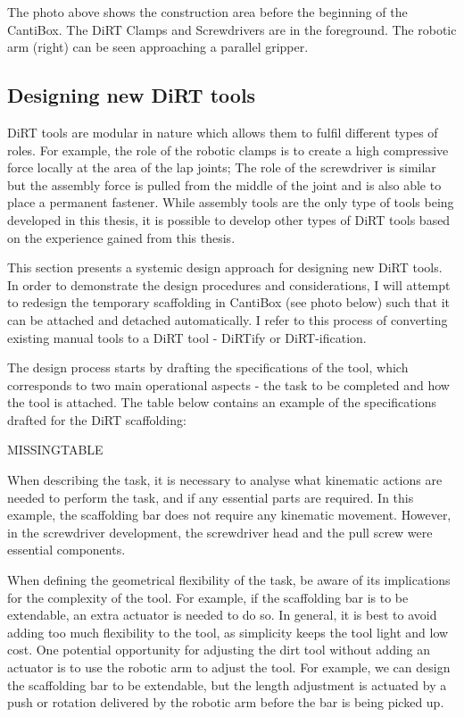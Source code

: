 


The photo above shows the construction area before the beginning of the CantiBox. The DiRT Clamps and Screwdrivers are in the foreground. The robotic arm (right) can be seen approaching a parallel gripper. 

\subsection{Designing new DiRT tools}
\label{subsection:discussion_designing_new_dirt_tools}

DiRT tools are modular in nature which allows them to fulfil different types of roles. For example, the role of the robotic clamps is to create a high compressive force locally at the area of the lap joints; The role of the screwdriver is similar but the assembly force is pulled from the middle of the joint and is also able to place a permanent fastener. While assembly tools are the only type of tools being developed in this thesis, it is possible to develop other types of DiRT tools based on the experience gained from this thesis. 

This section presents a systemic design approach for designing new DiRT tools. In order to demonstrate the design procedures and considerations, I will attempt to redesign the temporary scaffolding in CantiBox (see photo below) such that it can be attached and detached automatically. I refer to this process of converting existing manual tools to a DiRT tool - DiRTify or DiRT-ification.



The design process starts by drafting the specifications of the tool, which corresponds to two main operational aspects - the task to be completed and how the tool is attached. The table below contains an example of the specifications drafted for the DiRT scaffolding:

MISSINGTABLE

When describing the task, it is necessary to analyse what kinematic actions are needed to perform the task, and if any essential parts are required. In this example, the scaffolding bar does not require any kinematic movement. However, in the screwdriver development, the screwdriver head and the pull screw were essential components.

When defining the geometrical flexibility of the task, be aware of its implications for the complexity of the tool. For example, if the scaffolding bar is to be extendable, an extra actuator is needed to do so. In general, it is best to avoid adding too much flexibility to the tool, as simplicity keeps the tool light and low cost. One potential opportunity for adjusting the dirt tool without adding an actuator is to use the robotic arm to adjust the tool. For example, we can design the scaffolding bar to be extendable, but the length adjustment is actuated by a push or rotation delivered by the robotic arm before the bar is being picked up.

